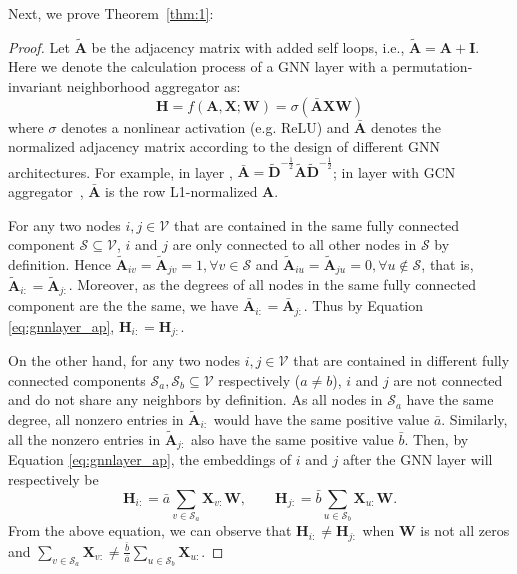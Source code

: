 \documentclass[letterpaper]{article} \usepackage{aaai21}  \usepackage{times}  \usepackage{helvet} \usepackage{courier}  \usepackage[hyphens]{url}  \usepackage{graphicx} \urlstyle{rm} \def\UrlFont{\rm}  \usepackage{natbib}  \usepackage{caption} \frenchspacing  \setlength{\pdfpagewidth}{8.5in}  \setlength{\pdfpageheight}{11in}
\begin{document}
Next, we prove Theorem~\ref{thm:1}:
\begin{proof}
Let $\tilde{\mathbf{A}}$ be the adjacency matrix with added self loops, i.e., $\tilde{\mathbf{A}}=\mathbf{A}+\mathbf{I}$. Here we denote the calculation process of a GNN layer with a permutation-invariant neighborhood aggregator as: 
\begin{equation}
    \mathbf{H} = f(\mathbf{A}, \mathbf{X}; \mathbf{W}) = \sigma(\bar{\mathbf{A}} \mathbf{X} \mathbf{W})
    \label{eq:gnnlayer_ap}
\end{equation}
where $\sigma$ denotes a nonlinear activation (e.g. ReLU) and $\bar{\mathbf{A}}$ denotes the normalized adjacency matrix according to the design of different GNN architectures. For example, in \gcn layer \cite{kipf2016semi}, $\bar{\mathbf{A}}=\tilde{\mathbf{D}}^{-\frac{1}{2}}\tilde{\mathbf{A}}\tilde{\mathbf{D}}^{-\frac{1}{2}}$; in \gsage layer with GCN aggregator~\cite{hamilton2017inductive}, $\bar{\mathbf{A}}$ is the row L1-normalized $\mathbf{A}$.

For any two nodes $i,j\in \mathcal{V}$ that are contained in the same fully connected component $\mathcal{S} \subseteq \mathcal{V}$, $i$ and $j$ are only connected to all other nodes in $\mathcal{S}$ by definition. Hence $\tilde{\mathbf{A}}_{iv} = \tilde{\mathbf{A}}_{jv} = 1, \forall v \in \mathcal{S}$ and $\tilde{\mathbf{A}}_{iu} = \tilde{\mathbf{A}}_{ju} = 0, \forall u \notin \mathcal{S}$, that is, $\tilde{\mathbf{A}}_{i:} = \tilde{\mathbf{A}}_{j:}$. Moreover, as the degrees of all nodes in the same fully connected component are the the same, we have $\bar{\mathbf{A}}_{i:} = \bar{\mathbf{A}}_{j:}$. Thus by Equation \ref{eq:gnnlayer_ap}, $\mathbf{H}_{i:} = \mathbf{H}_{j:}$.

On the other hand, for any two nodes $i,j\in \mathcal{V}$ that are contained in different fully connected components $\mathcal{S}_a, \mathcal{S}_b \subseteq \mathcal{V}$ respectively ($a \neq b$), $i$ and $j$ are not connected and do not share any neighbors by definition. As all nodes in $\mathcal{S}_a$ have the same degree, all nonzero entries in $\tilde{\mathbf{A}}_{i:}$ would have the same positive value $\bar{a}$. Similarly, all the nonzero entries in $\tilde{\mathbf{A}}_{j:}$ also have the same positive value $\bar{b}$. Then, by Equation \ref{eq:gnnlayer_ap}, the embeddings of $i$ and $j$ after the GNN layer will respectively be 
\begin{equation}
    \mathbf{H}_{i:} = \bar{a}\sum_{v\in\mathcal{S}_a}{\mathbf{X}_{v:}}\mathbf{W}, \qquad \mathbf{H}_{j:} = \bar{b}\sum_{u\in\mathcal{S}_b}{\mathbf{X}_{u:}}\mathbf{W}.
\end{equation}
From the above equation, we can observe that $\mathbf{H}_{i:} \neq \mathbf{H}_{j:}$ when $\mathbf{W}$ is not all zeros and $\sum_{v \in \mathcal{S}_a}{\mathbf{X}_{v:}} \neq \frac{\bar{b}}{\bar{a}} \sum_{u \in \mathcal{S}_b}{\mathbf{X}_{u:}}$.
\end{proof}
\end{document}
